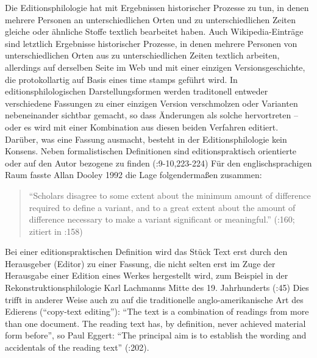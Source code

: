 \documentclass[fontsize=12pt]{scrartcl}
\begin{document}
Die Editionsphilologie hat mit Ergebnissen historischer Prozesse zu tun, in denen meh\-rere Per\-so\-nen an unterschiedlichen Orten und zu unterschiedlichen Zei\-ten glei\-che oder \"ahnliche Stoffe textlich bearbeitet haben. Auch Wi\-ki\-pe\-dia-Eintr\"age sind letzt\-lich Ergebnisse historischer Prozesse, in denen meh\-rere Per\-so\-nen von unterschiedlichen Orten aus zu unterschiedlichen Zei\-ten textlich arbei\-ten, al\-ler\-dings auf derselben Seite im Web und mit einer einzigen Versionsgeschichte, die protokollartig auf Basis eines time stamps gef\"uhrt wird.
In editionsphilologischen Darstellungsformen werden traditonell entweder verschiedene Fassungen zu einer einzigen Version verschmolzen oder Varianten nebeneinander sichtbar gemacht, so dass \"Anderungen als solche hervortreten -- oder es wird mit einer Kombination aus diesen beiden Verfahren editiert.
Dar\"uber, was eine Fassung ausmacht, be\-steht in der Edi\-tions\-philologie kein Konsens. Neben formalistischen Definitionen sind editionspraktisch orientierte oder auf den Autor\textsuperscript{\tiny *} bezogene zu finden (\cite{Kraftetal2001}:9-10,223-224) F\"ur den eng\-lischspra\-chi\-gen Raum fasste Allan Dooley 1992 die Lage folgenderma{\ss}en zusammen: 

\singlespacing
\begin{quote}
"`Scholars disagree to some extent about the minimum amount of difference required to define a variant, and to a great extent about the amount of difference necessary to make a variant significant or meaningful."' (\cite{Dooley1992}:160; zitiert in \cite{Ravelhofer2005}:158)
\end{quote}
\onehalfspacing

Bei einer editionspraktischen Definition wird das St\"uck Text erst durch den He\-raus\-geber\textsuperscript{\tiny *} (Editor\textsuperscript{\tiny *}) zu einer Fassung, die nicht selten erst im Zuge der He\-rausgabe einer Edition eines Werkes hergestellt wird, zum Beispiel in der Rekonstruktionsphilologie Karl Lachmanns Mitte des 19. Jahrhunderts (\cite{StarkeyWandhoff2008}:45) Dies trifft in an\-de\-rer Weise auch zu auf die traditionelle anglo-amerikanische Art des Edierens ("`copy-text editing"'): "`The text is a combination of readings from more than one document. The reading text has, by definition, never achieved material form before"', so Paul Eggert: "`The principal aim is to establish the wording and accidentals of the reading text"' (\cite{Eggert2005}:202).
\end{document}
